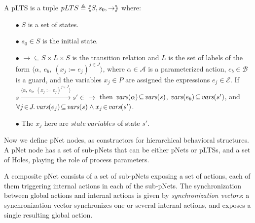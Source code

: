 \documentclass{lncs/llncs}
\newcommand{\QIN}[1]{\textcolor{airforceblue}{#1}}
\def\AlgE{\mathcal{E}}
\def\AlgA{\mathcal{A}}
\def\AlgB{\mathcal{B}}
\begin{document}

\begin{definition}[pLTS]
\label{pLTS}
A pLTS is a tuple
$pLTS\triangleq\langle\hspace{-0.58ex}\langle S,s_0, \to\rangle\hspace{-0.58ex}\rangle$ where:
\begin{itemize}
\item[$\bullet$]
$S$ is a set of states.
\item[$\bullet$]
$s_0 \in S$ is the initial state.
\item[$\bullet$] $\to \subseteq S \times L \times S$ is the transition relation and 
$L$ is the set of labels of the form
$\langle \alpha,~e_b,~(x_j\!:= {e}_j)^{j\in J}\rangle$,
where $\alpha \in\AlgA$ is a parameterized action, $e_b \in
\AlgB$ is a guard, and the variables $x_j\in P$
are assigned the expressions $e_j\in \AlgE$.
If 
$s \xrightarrow{\langle \alpha,~e_b,~(x_j\!:= {e}_j)^{j\in
		J}\rangle} s'\in \to $ then 
		$\vars(\alpha)\!\subseteq\! \vars(s)$, 
		$\vars(e_b)\!\subseteq\! \vars(s')$, and
		$\forall j\!\in\! J .\,\vars(e_j)\!\subseteq\! \vars(s)\land 
x_j\!\in\!\vars(s')$.
\item[$\bullet$]
The $x_j$ here are $state\ variables$ of state $s'$. 


\end{itemize}
\end{definition}

Now we define
pNet nodes, as constructors for hierarchical behavioral structures.
A pNet node has a set of sub-pNets that can be either pNets or pLTSs, and a
set of Holes, playing the role of process parameters.

A composite pNet consists of a set of sub-pNets exposing
a set of actions, each of them triggering internal actions in each of
the sub-pNets. The synchronization between global actions and
internal actions is given by  \emph{synchronization vectors}: a
synchronization vector synchronizes one or several internal actions, and
exposes a single resulting global action.
\end{document}
